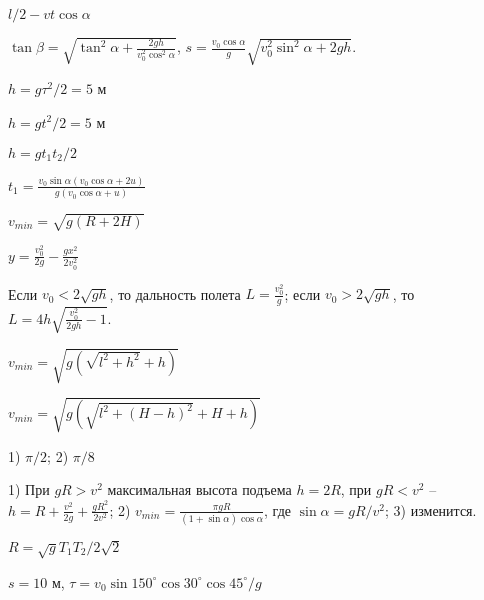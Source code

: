 \begin{Answer}{18}
$l/2 - vt \cos \alpha$
\end{Answer}
\begin{Answer}{19}
$\tan \beta = \sqrt{\tan^2 \alpha + \frac{2gh}{v_0^2 \cos^2 \alpha}}$, $s=\frac{v_0 \cos \alpha}{g} \sqrt{v_0^2 \sin^2 \alpha + 2gh}$.
\end{Answer}
\begin{Answer}{20}
$h = g\tau^2/2 = 5$ м		
\end{Answer}
\begin{Answer}{21}
$h = gt^2/2 = 5$ м
\end{Answer}
\begin{Answer}{22}
$h = gt_1t_2/2$
\end{Answer}
\begin{Answer}{23}
$t_1 = \frac{v_0 \sin \alpha (v_0 \cos \alpha + 2u)}{g(v_0 \cos \alpha + u)}$
\end{Answer}
\begin{Answer}{24}
$v_{min} = \sqrt{g(R+2H)}$
\end{Answer}
\begin{Answer}{25}
$y = \frac{v_0^2}{2g} - \frac{gx^2}{2v_0^2}$
\end{Answer}
\begin{Answer}{26}
Если $v_0 < 2 \sqrt{gh}$, то дальность полета $L = \frac{v_0^2}{g}$; если $v_0 > 2 \sqrt{gh}$, то $L = 4h \sqrt{\frac{v_0^2}{2gh}-1}$.
\end{Answer}
\begin{Answer}{27}
$v_{min} = \sqrt{g \left(\sqrt{l^2 + h^2} + h \right)}$
\end{Answer}
\begin{Answer}{28}
$v_{min} = \sqrt{g \left(\sqrt{l^2 + (H-h)^2} + H + h \right)}$
\end{Answer}
\begin{Answer}{29}
1) $\pi/2$; 2) $\pi/8$
\end{Answer}
\begin{Answer}{30}
1) При $gR > v^2$ максимальная высота подъема $h = 2R$, при $gR < v^2$ -- $h = R +\frac{v^2}{2g} + \frac{gR^2}{2v^2}$; 2) $v_{min} = \frac{\pi g R}{(1+ \sin \alpha) \cos \alpha}$, где $\sin \alpha = gR/v^2$; 3) изменится.
\end{Answer}
\begin{Answer}{31}
$R = \sqrt{g} T_1 T_2 /2\sqrt{2}$
\end{Answer}
\begin{Answer}{32}
$s = 10$ м, $\tau = v_0 \sin 150^{\circ} \cos 30^{\circ} \cos 45^{\circ} /g$
\end{Answer}
